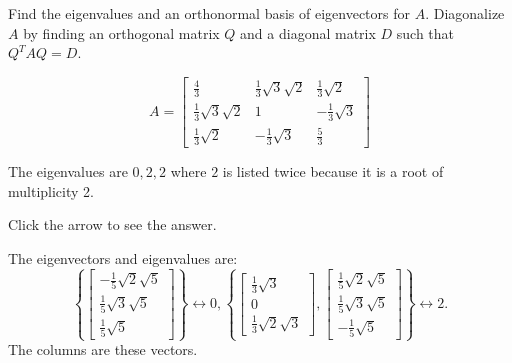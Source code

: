 \documentclass{ximera}
\begin{document}
 \begin{problem}\label{prb:9.9} Find the eigenvalues and an orthonormal basis of eigenvectors for $A.$
Diagonalize $A$ by finding an orthogonal matrix $Q$ and a diagonal matrix $D$
such that $Q^{T}AQ=D$.

\begin{equation*}
A=\left[
\begin{array}{ccc}
 \frac{4}{3} &  \frac{1}{3}\sqrt{3}\sqrt{2} &
 \frac{1}{3}\sqrt{2} \\
 \frac{1}{3}\sqrt{3}\sqrt{2} & 1 & - \frac{1}{3}
\sqrt{3} \\
 \frac{1}{3}\sqrt{2} & - \frac{1}{3}\sqrt{3} &
 \frac{5}{3}
\end{array}
\right]
\end{equation*}

\begin{hint} 
The eigenvalues are $0,2,2$ where $2$ is listed twice because it is a root of multiplicity 2.

Click the arrow to see the answer. \begin{expandable}
The eigenvectors and eigenvalues are:
\[
\left\{ \left[
\begin{array}{c}
-\frac{1}{5}\sqrt{2}\sqrt{5} \\
\frac{1}{5}\sqrt{3}\sqrt{5} \\
\frac{1}{5}\sqrt{5}
\end{array}
\right] \right\} \leftrightarrow 0,\left\{ \left[
\begin{array}{c}
\frac{1}{3}\sqrt{3} \\
0 \\
\frac{1}{3}\sqrt{2}\sqrt{3}%
\end{array}
\right] ,\left[
\begin{array}{c}
\frac{1}{5}\sqrt{2}\sqrt{5} \\
\frac{1}{5}\sqrt{3}\sqrt{5} \\
-\frac{1}{5}\sqrt{5}
\end{array}
\right] \right\} \leftrightarrow 2.
\]
The columns are these vectors.
\end{expandable} \end{hint}
\end{problem}
\end{document}
